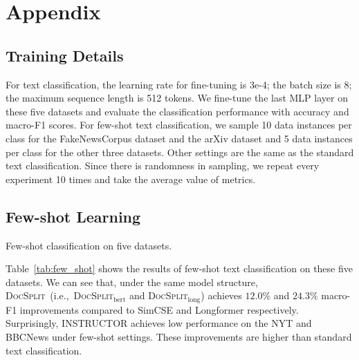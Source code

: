 \documentclass[11pt]{article}
\newcommand{\our}{\mbox{\textsc{DocSplit}}}
\begin{document}





\clearpage
\appendix
\section{Appendix}

\subsection{Training Details}
\label{app:details}
For text classification, the learning rate for fine-tuning is 3e-4; the batch size is 8; the maximum sequence length is 512 tokens. 
We fine-tune the last MLP layer on these five datasets and evaluate the classification performance with accuracy and macro-F1 scores.
For few-shot text classification, we sample 10 data instances per class for the FakeNewsCorpus dataset and the arXiv dataset and 5 data instances per class for the other three datasets. 
Other settings are the same as the standard text classification. 
Since there is randomness in sampling, we repeat every experiment 10 times and take the average value of metrics.

\subsection{Few-shot Learning}
\begin{table}
    \centering
    
    \caption{Few-shot classification on five datasets. }
    \vspace{-3mm}
    \label{tab:few_shot}
\end{table}
Table~\ref{tab:few_shot} shows the results of few-shot text classification on these five datasets. 
We can see that, under the same model structure, \our~(i.e.,~\our$_{\mathrm{bert}}$ and \our$_{\mathrm{long}}$) achieves $12.0\%$ and $24.3\%$ macro-F1 improvements compared to SimCSE and Longformer respectively. 
Surprisingly, INSTRUCTOR achieves low performance on the NYT and BBCNews under few-shot settings.
These improvements are higher than standard text classification. 
\end{document}

